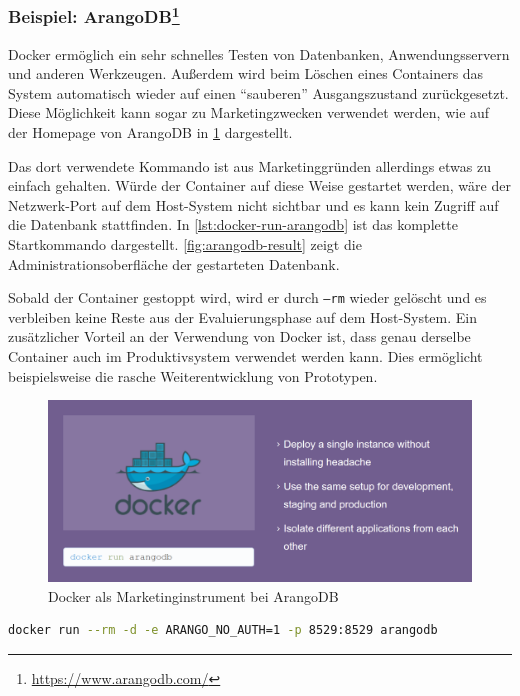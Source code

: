 \subsubsection{Beispiel: ArangoDB\protect\footnote{\url{https://www.arangodb.com/}}}
Docker ermöglich ein sehr schnelles Testen von Datenbanken, Anwendungsservern und anderen Werkzeugen.
Außerdem wird beim Löschen eines Containers das System automatisch wieder auf einen "`sauberen"' Ausgangszustand zurückgesetzt.
Diese Möglichkeit kann sogar zu Marketingzwecken verwendet werden, wie auf der Homepage von ArangoDB in \cref{fig:arangodb-docker-marketing} dargestellt.

Das dort verwendete Kommando ist aus Marketinggründen allerdings etwas zu einfach gehalten.
Würde der Container auf diese Weise gestartet werden, wäre der Netzwerk-Port auf dem Host-System nicht sichtbar und es kann kein Zugriff auf die Datenbank stattfinden.
In \cref{lst:docker-run-arangodb} ist das komplette Startkommando dargestellt.
\cref{fig:arangodb-result} zeigt die Administrationsoberfläche der gestarteten Datenbank.

Sobald der Container gestoppt wird, wird er durch \texttt{--rm} wieder gelöscht und es verbleiben keine Reste aus der Evaluierungsphase auf dem Host-System.
Ein zusätzlicher Vorteil an der Verwendung von Docker ist, dass genau derselbe Container auch im Produktivsystem verwendet werden kann.
Dies ermöglicht beispielsweise die rasche Weiterentwicklung von Prototypen.

\begin{figure}[htbp]
    \centering
    \includegraphics[width=0.7\linewidth,clip]{images/arangodb-docker-marketing}
    \caption{Docker als Marketinginstrument bei ArangoDB}
\label{fig:arangodb-docker-marketing}
\end{figure}

\begin{lstlisting}[caption=Docker-Kommando zum Starten von ArangoDB, language=bash, label=lst:docker-run-arangodb]
docker run --rm -d -e ARANGO_NO_AUTH=1 -p 8529:8529 arangodb
\end{lstlisting}

